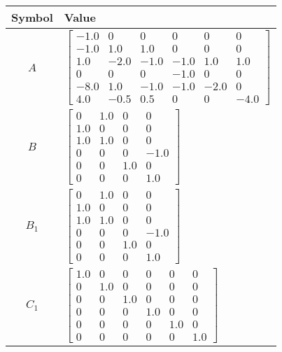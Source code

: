 \begin{tabular}{cl}
\hline
  Symbol  & Value                                                                                                                                                                                                                                 \\
\hline
   $A$    & $\left[\begin{matrix}-1.0 & 0 & 0 & 0 & 0 & 0\\-1.0 & 1.0 & 1.0 & 0 & 0 & 0\\1.0 & -2.0 & -1.0 & -1.0 & 1.0 & 1.0\\0 & 0 & 0 & -1.0 & 0 & 0\\-8.0 & 1.0 & -1.0 & -1.0 & -2.0 & 0\\4.0 & -0.5 & 0.5 & 0 & 0 & -4.0\end{matrix}\right]$ \\
   $B$    & $\left[\begin{matrix}0 & 1.0 & 0 & 0\\1.0 & 0 & 0 & 0\\1.0 & 1.0 & 0 & 0\\0 & 0 & 0 & -1.0\\0 & 0 & 1.0 & 0\\0 & 0 & 0 & 1.0\end{matrix}\right]$                                                                                      \\
 $B_{1}$  & $\left[\begin{matrix}0 & 1.0 & 0 & 0\\1.0 & 0 & 0 & 0\\1.0 & 1.0 & 0 & 0\\0 & 0 & 0 & -1.0\\0 & 0 & 1.0 & 0\\0 & 0 & 0 & 1.0\end{matrix}\right]$                                                                                      \\
 $C_{1}$  & $\left[\begin{matrix}1.0 & 0 & 0 & 0 & 0 & 0\\0 & 1.0 & 0 & 0 & 0 & 0\\0 & 0 & 1.0 & 0 & 0 & 0\\0 & 0 & 0 & 1.0 & 0 & 0\\0 & 0 & 0 & 0 & 1.0 & 0\\0 & 0 & 0 & 0 & 0 & 1.0\end{matrix}\right]$                                         \\

\end{tabular}
